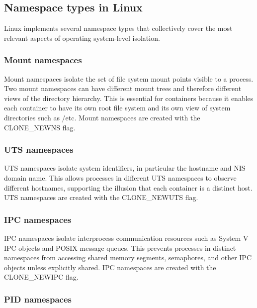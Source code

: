 \documentclass[11pt,a4paper,openany]{report}
\begin{document}
\subsection{Namespace types in Linux}

Linux implements several namespace types that collectively cover the most relevant aspects of operating system-level isolation.

\subsubsection*{Mount namespaces}

Mount namespaces isolate the set of file system mount points visible to a process. Two mount namespaces can have different mount trees and therefore different views of the directory hierarchy. This is essential for containers because it enables each container to have its own root file system and its own view of system directories such as /etc. Mount namespaces are created with the CLONE\_NEWNS flag.

\subsubsection*{UTS namespaces}

UTS namespaces isolate system identifiers, in particular the hostname and NIS domain name. This allows processes in different UTS namespaces to observe different hostnames, supporting the illusion that each container is a distinct host. UTS namespaces are created with the CLONE\_NEWUTS flag.

\subsubsection*{IPC namespaces}

IPC namespaces isolate interprocess communication resources such as System V IPC objects and POSIX message queues. This prevents processes in distinct namespaces from accessing shared memory segments, semaphores, and other IPC objects unless explicitly shared. IPC namespaces are created with the CLONE\_NEWIPC flag.

\subsubsection*{PID namespaces}
\end{document}
